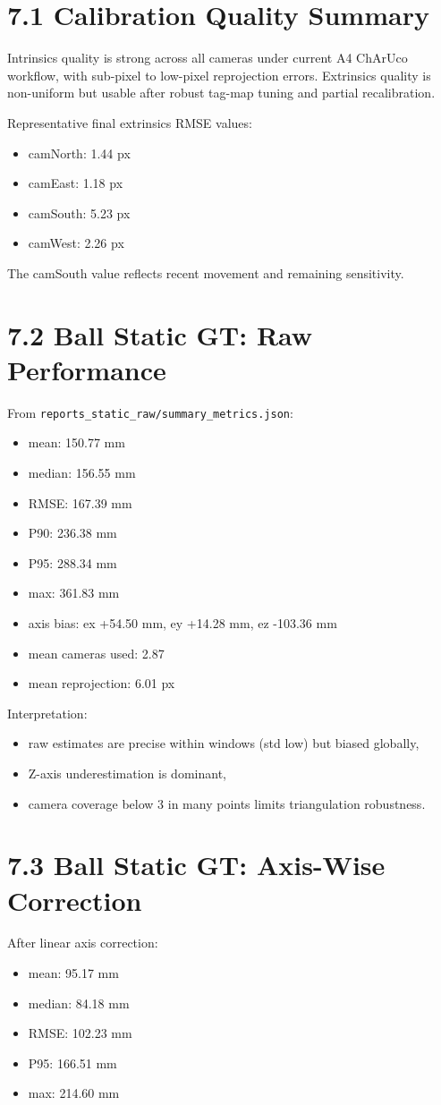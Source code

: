 \section{7.1 Calibration Quality Summary}
Intrinsics quality is strong across all cameras under current A4 ChArUco workflow, with sub-pixel to low-pixel reprojection errors. Extrinsics quality is non-uniform but usable after robust tag-map tuning and partial recalibration.

Representative final extrinsics RMSE values:
\begin{itemize}
  \item camNorth: 1.44 px
  \item camEast: 1.18 px
  \item camSouth: 5.23 px
  \item camWest: 2.26 px
\end{itemize}

The camSouth value reflects recent movement and remaining sensitivity.

\section{7.2 Ball Static GT: Raw Performance}
From \texttt{reports\_static\_raw/summary\_metrics.json}:
\begin{itemize}
  \item mean: 150.77 mm
  \item median: 156.55 mm
  \item RMSE: 167.39 mm
  \item P90: 236.38 mm
  \item P95: 288.34 mm
  \item max: 361.83 mm
  \item axis bias: ex +54.50 mm, ey +14.28 mm, ez -103.36 mm
  \item mean cameras used: 2.87
  \item mean reprojection: 6.01 px
\end{itemize}

Interpretation:
\begin{itemize}
  \item raw estimates are precise within windows (std low) but biased globally,
  \item Z-axis underestimation is dominant,
  \item camera coverage below 3 in many points limits triangulation robustness.
\end{itemize}

\section{7.3 Ball Static GT: Axis-Wise Correction}
After linear axis correction:
\begin{itemize}
  \item mean: 95.17 mm
  \item median: 84.18 mm
  \item RMSE: 102.23 mm
  \item P95: 166.51 mm
  \item max: 214.60 mm
\end{itemize}

